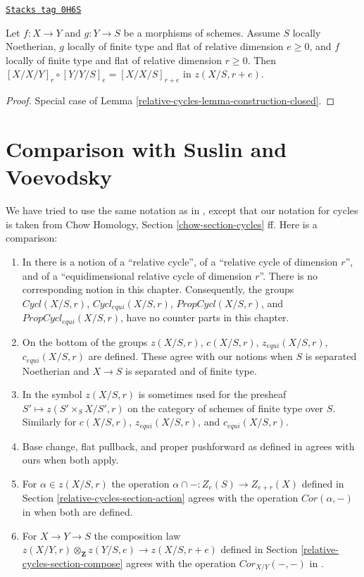 \begin{lemma}
\label{relative-cycles-lemma-composition-fundamental-cycles}
\href{https://stacks.math.columbia.edu/tag/0H6S}{\texttt{Stacks tag 0H6S}}

Let $f : X \to Y$ and $g : Y \to S$ be a morphisms of schemes.
Assume $S$ locally Noetherian, $g$ locally of finite type and
flat of relative dimension $e \ge 0$, and $f$ locally of finite type
and flat of relative dimension $r \geq 0$. Then
$[X/X/Y]_r \circ [Y/Y/S]_e = [X/X/S]_{r + e}$ in $z(X/S, r + e)$.
\end{lemma}

\begin{proof}
Special case of Lemma \ref{relative-cycles-lemma-construction-closed}.
\end{proof}

\section{Comparison with Suslin and Voevodsky}
\label{relative-cycles-section-compare}
We have tried to use the same notation as in \cite{SV}, except that
our notation for cycles is taken from
Chow Homology, Section \ref{chow-section-cycles} ff.
Here is a comparison:
\begin{enumerate}
\item In \cite[Section 3.1]{SV} there is a notion of a
``relative cycle'', of a ``relative cycle of dimension $r$'', and
of a ``equidimensional relative cycle of dimension $r$''.
There is no corresponding notion in this chapter. Consequently, the groups
$Cycl(X/S, r)$, $Cycl_{equi}(X/S, r)$,
$PropCycl(X/S, r)$, and $PropCycl_{equi}(X/S, r)$,
have no counter parts in this chapter.
\item On the bottom of \cite[page 36]{SV} the groups
$z(X/S, r)$, $c(X/S, r)$, $z_{equi}(X/S, r)$, $c_{equi}(X/S, r)$
are defined. These agree with our notions when $S$ is separated
Noetherian and $X \to S$ is separated and of finite type.
\item In \cite{SV} the symbol $z(X/S, r)$ is sometimes used for the
presheaf $S' \mapsto z(S' \times_S X/S', r)$ on the category of schemes
of finite type over $S$. Similarly for
$c(X/S, r)$, $z_{equi}(X/S, r)$, and $c_{equi}(X/S, r)$.
\item Base change, flat pullback, and proper pushforward
as defined in \cite{SV} agrees with ours when both apply.
\item For $\alpha \in z(X/S, r)$ the operation
$\alpha \cap - : Z_e(S) \to Z_{e + r}(X)$ defined in
Section \ref{relative-cycles-section-action} agrees with
the operation $Cor(\alpha, -)$ in \cite[Section 3.7]{SV}
when both are defined.
\item For $X \to Y \to S$ the composition law
$z(X/Y, r) \otimes_\mathbf{Z} z(Y/S, e) \longrightarrow z(X/S, r + e)$
defined in Section \ref{relative-cycles-section-compose}
agrees with the operation $Cor_{X/Y}(-, -)$ in
\cite[Corollary 3.7.5]{SV}.
\end{enumerate}


